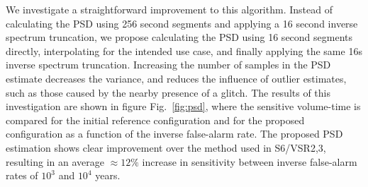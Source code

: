 We investigate a straightforward improvement to this algorithm. Instead of calculating the PSD using 256 second segments and applying a 16 second inverse spectrum truncation, we propose calculating the PSD using 16 second segments directly, interpolating for the intended use case, and finally applying the same 16s inverse spectrum truncation. Increasing the number of samples in the PSD estimate decreases the variance, and reduces the influence of outlier estimates, such as those caused by the nearby presence of a glitch. The results of this investigation are shown in figure Fig.~\ref{fig:psd}, where the sensitive volume-time is compared for the initial reference configuration and for the proposed configuration as a function of the inverse false-alarm rate. The proposed PSD estimation shows clear improvement over the method used in S6/VSR2,3, resulting in an average $\approx 12\%$ increase in sensitivity between inverse false-alarm rates of $10^3$ and $10^4$ years.  




